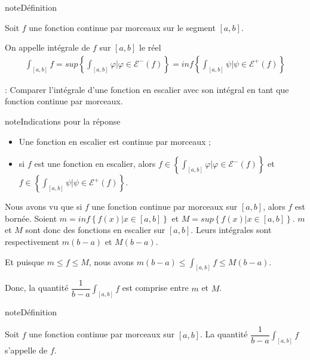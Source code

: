 \documentclass[letterpaper,10pt,french]{sphinxmanual}
\begin{document}
\begin{sphinxadmonition}{note}{Définition}

\sphinxAtStartPar
Soit \(f\) une fonction continue par morceaux sur le segment \([a, b]\).

\sphinxAtStartPar
On appelle intégrale de \(f\) sur \([a, b]\) le réel
\begin{equation*}
\begin{split}
\int_{[a, b]} f = sup\left\{\int_{[a, b]} \varphi | \varphi \in \mathcal{E}^-(f)\right\}= inf\left\{\int_{[a, b]} \psi | \psi \in \mathcal{E}^+(f)\right\}
\end{split}
\end{equation*}\end{sphinxadmonition}

\sphinxAtStartPar
{} : Comparer l’intégrale d’une fonction en escalier avec son intégral en tant que fonction continue par morceaux.

\begin{sphinxadmonition}{note}{Indications pour la réponse}
\begin{itemize}
\item {} 
\sphinxAtStartPar
Une fonction en escalier est continue par morceaux ;

\item {} 
\sphinxAtStartPar
si \(f\) est une fonction en escalier, alors \(f \in \left\{\int_{[a, b]} \varphi | \varphi \in \mathcal{E}^-(f)\right\}\) et \( f \in \left\{\int_{[a, b]} \psi | \psi \in \mathcal{E}^+(f)\right\}\).

\end{itemize}
\end{sphinxadmonition}

\sphinxAtStartPar
Nous avons vu que si \(f\) une fonction continue par morceaux sur \([a, b]\), alors \(f\) est bornée. Soient \(m = inf \left\{f(x)| x\in [a, b]\right\}\) et \(M = sup \left\{f(x)| x\in [a, b]\right\}\). \(m\) et \(M\) sont donc des fonctions en escalier sur \([a, b]\). Leurs intégrales sont respectivement \(m(b-a)\) et \(M(b-a)\).

\sphinxAtStartPar
Et puisque \(m \leq f \leq M\), nous avons \(m(b-a)\leq \int_{[a,b]} f \leq M(b-a)\).

\sphinxAtStartPar
Donc, la quantité \(\dfrac{1}{b-a}\int_{[a, b]} f\) est comprise entre \(m\) et \(M\).

\begin{sphinxadmonition}{note}{Définition}

\sphinxAtStartPar
Soit \(f\) une fonction continue par morceaux sur \([a, b]\). La quantité \(\dfrac{1}{b-a}\int_{[a, b]} f\) s’appelle  de \(f\).
\end{sphinxadmonition}
\end{document}
